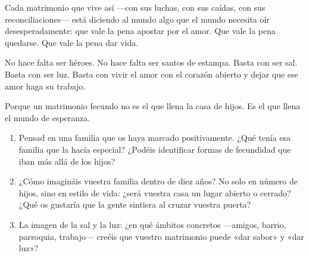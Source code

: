 Cada matrimonio que vive así ---con sus luchas, con sus caídas, con sus reconciliaciones--- está diciendo al mundo algo que el mundo necesita oír desesperadamente: que vale la pena apostar por el amor. Que vale la pena quedarse. Que vale la pena dar vida.

No hace falta ser héroes. No hace falta ser santos de estampa. Basta con ser sal. Basta con ser luz. Basta con vivir el amor con el corazón abierto y dejar que ese amor haga su trabajo.

Porque un matrimonio fecundo no es el que llena la casa de hijos. Es el que llena el mundo de esperanza.

\paracaminar

\begin{enumerate}
  \item Pensad en una familia que os haya marcado positivamente. ¿Qué tenía esa familia que la hacía especial? ¿Podéis identificar formas de fecundidad que iban más allá de los hijos?

  \item ¿Cómo imagináis vuestra familia dentro de diez años? No solo en número de hijos, sino en estilo de vida: ¿será vuestra casa un lugar abierto o cerrado? ¿Qué os gustaría que la gente sintiera al cruzar vuestra puerta?

  \item La imagen de la sal y la luz: ¿en qué ámbitos concretos ---amigos, barrio, parroquia, trabajo--- creéis que vuestro matrimonio puede «dar sabor» y «dar luz»?
\end{enumerate}

